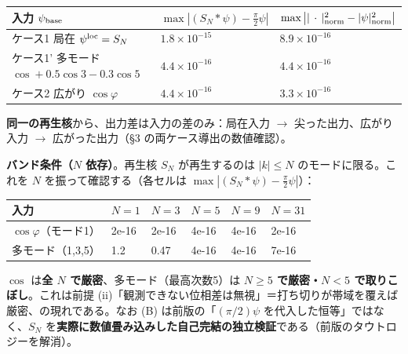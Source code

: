 \documentclass[
]{ltjsarticle}
\newcounter{none} %
\begin{document}
{\def\LTcaptype{none} %
\begin{longtable}[]{@{}
  >{\raggedright\arraybackslash}p{}
  >{\raggedright\arraybackslash}p{}
  >{\raggedright\arraybackslash}p{}@{}}
\toprule\noalign{}
\begin{minipage}[b]{\linewidth}\raggedright
入力 \(\psi_{\rm base}\)
\end{minipage} & \begin{minipage}[b]{\linewidth}\raggedright
\(\max|(S_N*\psi)-\tfrac{\pi}{2}\psi|\)
\end{minipage} & \begin{minipage}[b]{\linewidth}\raggedright
\(\max\big||\,\cdot\,|^2_{\rm norm}-|\psi|^2_{\rm norm}\big|\)
\end{minipage} \\
\midrule\noalign{}
\endhead
\bottomrule\noalign{}
\endlastfoot
ケース1 局在 \(\psi^{\rm loc}=S_N\) & \(1.8\times10^{-15}\) &
\(8.9\times10^{-16}\) \\
ケース1' 多モード \(\cos+0.5\cos3-0.3\cos5\) & \(4.4\times10^{-16}\) &
\(4.4\times10^{-16}\) \\
ケース2 広がり \(\cos\varphi\) & \(4.4\times10^{-16}\) &
\(3.3\times10^{-16}\) \\
\end{longtable}
}

\textbf{同一の再生核}から、出力差は入力の差のみ：局在入力 \(\to\)
尖った出力、広がり入力 \(\to\) 広がった出力（§3
の両ケース導出の数値確認）。

\textbf{バンド条件（\(N\) 依存）}。再生核 \(S_N\) が再生するのは
\(|k|\le N\) のモードに限る。これを \(N\) を振って確認する（各セルは
\(\max|(S_N*\psi)-\tfrac{\pi}{2}\psi|\)）：

{\def\LTcaptype{none} %
\begin{longtable}[]{@{}llllll@{}}
\toprule\noalign{}
入力 & \(N=1\) & \(N=3\) & \(N=5\) & \(N=9\) & \(N=31\) \\
\midrule\noalign{}
\endhead
\bottomrule\noalign{}
\endlastfoot
\(\cos\varphi\)（モード1） & 2e-16 & 2e-16 & 4e-16 & 4e-16 & 2e-16 \\
多モード（1,3,5） & 1.2 & 0.47 & 4e-16 & 4e-16 & 7e-16 \\
\end{longtable}
}

\(\cos\) は\textbf{全 \(N\) で厳密}、多モード（最高次数5）は
\textbf{\(N\ge5\) で厳密・\(N<5\) で取りこぼし}。これは前提
(ii)「観測できない位相差は無視」＝打ち切りが帯域を覆えば厳密、の現れである。なお
(B) は前版の「\((\pi/2)\psi\) を代入した恒等」ではなく、\(S_N\)
を\textbf{実際に数値畳み込みした自己完結の独立検証}である（前版のタウトロジーを解消）。
\end{document}
